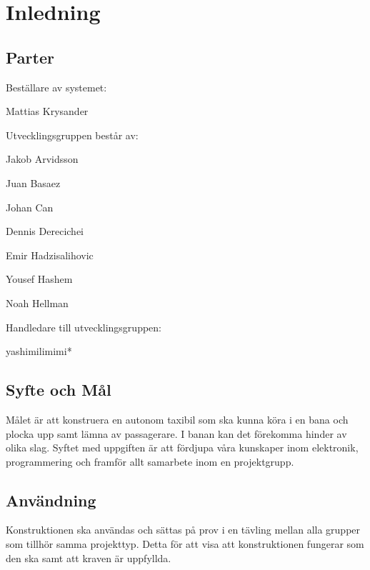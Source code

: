 \documentclass[kravspec/krav.tex]{subfiles}
\begin{document}
\section{Inledning}


\subsection{Parter}


Beställare av systemet:
\begin{list}{}
       \item Mattias Krysander      
\end{list}

\noindent
Utvecklingsgruppen består av:

\begin{list}{}
       \item Jakob Arvidsson
       \item Juan Basaez
       \item Johan Can
       \item Dennis Derecichei
       \item Emir Hadzisalihovic 
       \item Yousef Hashem
       \item Noah Hellman
\end{list}

\noindent
Handledare till utvecklingsgruppen:

\begin{list}{}	
	\item *yashimilimimi*
\end{list}

\subsection{Syfte och Mål}
Målet är att konstruera en autonom taxibil som ska kunna köra i en bana och
plocka upp samt lämna av passagerare. I banan kan det förekomma hinder av olika
slag. Syftet med uppgiften är att fördjupa våra kunskaper inom elektronik,
programmering och framför allt samarbete inom en projektgrupp.

\subsection{Användning}
Konstruktionen ska användas och sättas på prov i en tävling mellan alla grupper som tillhör samma projekttyp. Detta för att visa att konstruktionen fungerar som den ska samt att kraven är uppfyllda.
\end{document}
